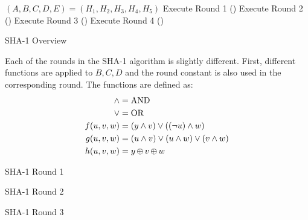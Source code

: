 \begin{algorithm}[H]
  \DontPrintSemicolon{}

  \BlankLine{}

  $(A, B, C, D, E) = (H_{1}, H_{2}, H_{3}, H_{4}, H_{5})$\;
  Execute Round 1 () \;
  Execute Round 2 () \;
  Execute Round 3 () \;
  Execute Round 4 () \;
  \caption{SHA-1 Overview}
  \label{algo:SHA_1_Overview}
\end{algorithm}

Each of the rounds in the SHA-1 algorithm is slightly different.
First, different functions are applied to $B, C, D$ and the round constant is also used in the corresponding round.
The functions are defined as:
\begin{align*}
  \wedge &= \text{AND} \\
  \vee &= \text{OR} \\
  f(u, v, w) &= (y \wedge v) \vee ((\neg u) \wedge w) \\
  g(u, v, w) &= (u \wedge v) \vee (u \wedge w) \vee (v \wedge w) \\
  h(u, v, w) &= y \operatorname{\oplus} v \operatorname{\oplus} w
\end{align*}

\begin{algorithm}[H]
  \DontPrintSemicolon{}
  \caption{SHA-1 Round 1}
  \label{algo:SHA_1_Round_1}
\end{algorithm}

\begin{algorithm}[H]
  \DontPrintSemicolon{}
  \caption{SHA-1 Round 2}
  \label{algo:SHA_1_Round_2}
\end{algorithm}

\begin{algorithm}[H]
  \DontPrintSemicolon{}
  \caption{SHA-1 Round 3}
  \label{algo:SHA_1_Round_3}
\end{algorithm}

